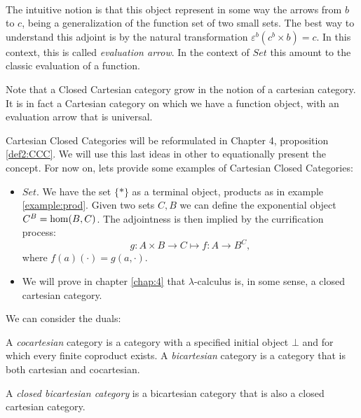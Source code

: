 \begin{definition}
\begin{itemize}
    \



    The intuitive notion is that this object represent in some way the arrows from $b$ to $c$, being a generalization of the function set of two small sets. The best way to understand this adjoint is by the natural transformation $\varepsilon^b(c^b\times b) = c$. In this context, this is called \emph{evaluation arrow}. In the context of $Set$ this amount to the classic evaluation of a function.\\

  \end{itemize}
  \begin{remark}
    Note that a Closed Cartesian category grow in the notion of a cartesian category. It is in fact a Cartesian category on which we have a function object, with an evaluation arrow that is universal.
  \end{remark}

  Cartesian Closed Categories will be reformulated in Chapter 4, proposition \ref{def2:CCC}. We will use this last ideas in other to equationally present the concept. For now on, lets provide some examples of Cartesian Closed Categories:


  

  \begin{example}
    \begin{itemize}
    \item $Set$. We have the set $\{*\}$ as a terminal object, products as in example \ref{example:prod}. Given two sets $C, B$ we can define the exponential object $C^B= \operatorname{hom} (B,C)$. The adjointness is then implied by the currification process:
      $$g: A\times B \to C \mapsto f: A \to B^C,$$
      where $f(a)(\cdot) = g(a,\cdot)$.
    \item We will prove in chapter \ref{chap:4} that $\lambda$-calculus is, in some sense, a closed cartesian category.
    \end{itemize}
  \end{example}


  We can consider the duals:

  \begin{definition}
    A \emph{cocartesian} category is a category with a specified initial object $\bot$ and for which every finite coproduct exists. A \emph{bicartesian} category is a category that is both cartesian and cocartesian.
  \end{definition}

  \begin{definition}A \emph{closed bicartesian category} is a bicartesian category that is also a closed cartesian category.
  \end{definition}


\end{definition}
